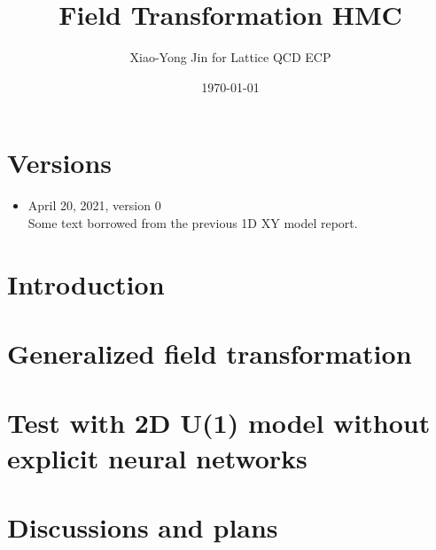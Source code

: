 


\author{Xiao-Yong Jin for Lattice QCD ECP}
\date{\today}
\title{Field Transformation HMC}


\maketitle
\tableofcontents

\section*{Versions}
\label{sec:versions}

\begin{itemize}
\item April 20, 2021, version 0\\
Some text borrowed from the previous 1D XY model report.
\end{itemize}

\section{Introduction}
\label{sec:intro}


\section{Generalized field transformation}
\label{sec:gen-ft}


\section{Test with 2D U(1) model without explicit neural networks}
\label{sec:test-wo-nn}


\section{Discussions and plans}
\label{sec:discuss-plans}


\ifdefined\directlua
  \printbibliography
\else
  
  
\fi


